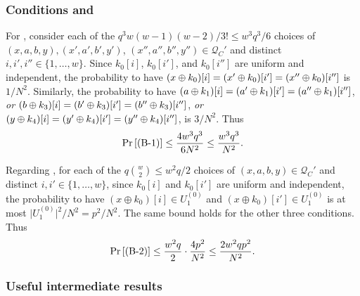 \subsubsection{Conditions \bone and \btwo}

For \bone, consider each of the $q^3w(w-1)(w-2)/3!\leq w^3q^3/6$ choices of $(x,a,b,y),(x',a',b',y')$, $(x'',a'',b'',y'')\in \mathcal{Q}_{C}'$ and distinct $i, i', i'' \in \{1, \ldots, w\}$. Since $k_0[i]$, $k_0[i']$, and $k_0[i'']$ are uniform and independent, the probability to have $(x\oplus k_0)[i]=(x'\oplus k_0)[i']=(x''\oplus k_0)[i'']$ is $1/N^2$. Similarly, the probability to have $(a\oplus k_1)[i]=(a'\oplus k_1)[i']=(a''\oplus k_1)[i'']$, {\it or} $(b\oplus k_3)[i]=(b'\oplus k_3)[i']=(b''\oplus k_3)[i'']$, {\it or} $(y\oplus k_4)[i]=(y'\oplus k_4)[i']=(y''\oplus k_4)[i'']$, is $3/N^2$. Thus
%
$$
\operatorname{Pr}\left[\text{(B-1)}\right] \leq \frac{4w^3q^3}{6N^2}\leq \frac{w^3q^3}{N^2}.
$$
%


		

%

Regarding \btwo, for each of the $q{w\choose 2}\leq w^2q/2$ choices of $(x,a,b, y) \in \mathcal{Q}_{C}'$ and distinct $i, i' \in \{1, \ldots, w\}$, since $k_0[i]$ and $k_0[i']$ are uniform and independent, the probability to have $(x \oplus k_{0})[i]\in U_1^{(0)}$ and $(x \oplus k_0)[i']\in U_1^{(0)}$ is at most $\big|U_1^{(0)}\big|^2/N^2=p^2/N^2$. The same bound holds for the other three conditions. Thus
%
$$
\operatorname{Pr}\left[\text{(B-2)}\right] \leq \frac{w^{2} q}{2}\cdot\frac{4p^2}{N^2}\leq\frac{2w^{2} q p^2}{N^{2}}.
$$
%



%




\subsubsection{Useful intermediate results}



